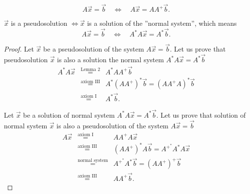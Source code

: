     \begin{lemma}{2}{} 
        $$
            A\vec{x}=\vec{b}
            \quad
            \Leftrightarrow
            \quad
            A\vec{x}=AA^+\vec{b}.
        $$
    \end{lemma}
    \begin{proposition}{}{}
        $\vec{x}$ is a pseudosolution
        $\Leftrightarrow
        \vec{x}$ is a solution of the ''normal system'', which means
        \[  
            A\vec{x}=\vec{b}
            \quad
            \Leftrightarrow
            \quad
            A^*A\vec{x} = A^*\vec{b}.  
        \]
    \end{proposition}
    \begin{proof}
        Let $\vec{x}$ be a pseudosolution of the system $A\vec{x}=\vec{b}$. Let us prove that pseudosolution $\vec{x}$  is also a solution the normal system $A^*A\vec{x} = A^*\vec{b}$
        \begin{eqnarray}    
            A^*A\vec{x}
            &\stackrel{\text{Lemma 2}}{=}&A^*AA^+\vec{b}\nonumber\\
            &\stackrel{\text{axiom III}}{=}&A^*(AA^+)^*\vec{b}
            =(AA^+A)^*\vec{b}\nonumber\\
            &\stackrel{\text{axiom I}}{=}&A^*\vec{b}.\nonumber
        \end{eqnarray}
        
         Let $\vec{x}$ be a solution of normal system $A^*A\vec{x}=A^*\vec{b}$. Let us prove that solution of normal system $\vec{x}$  is also a pseudosolution of the system $A\vec{x}=\vec{b}$
        \begin{eqnarray}
            A\vec{x}
            &\stackrel{\text{axiom I}}{=}&AA^+A\vec{x}\nonumber\\  
            &\stackrel{\text{axiom III}}{=}&(AA^+)^*A\vec{b}=A^{+^*}A^*A\vec{x}\nonumber\\      
            &\stackrel{\text{normal system}}{=}&A^{+^*}A^*\vec{b}=(AA^+)^+\vec{b}\nonumber\\
            &\stackrel{\text{axiom III}}{=}&AA^+\vec{b}.\nonumber
        \end{eqnarray}
    \end{proof}
    
